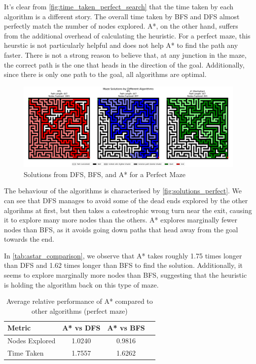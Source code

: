 \documentclass{article}
\begin{document}
It's clear from \autoref{fig:time_taken_perfect_search} that the time taken by each algorithm is a different story. The overall time taken by BFS and DFS almost perfectly match the number of nodes explored. A*, on the other hand, suffers from the additional overhead of calculating the heuristic. For a perfect maze, this heurstic is not particularly helpful and does not help A* to find the path any faster. There is not a strong reason to believe that, at any junction in the maze, the correct path is the one that heads in the direction of the goal. Additionally, since there is only one path to the goal, all algorithms are optimal. 

\begin{figure}[h]
    \centering
    \includegraphics[width=\textwidth]{Solutions_perfectt.png}
    \caption{Solutions from DFS, BFS, and A* for a Perfect Maze}
    \label{fig:solutions_perfect}
\end{figure}

The behaviour of the algorithms is characterised by \autoref{fig:solutions_perfect}. We can see that DFS manages to avoid some of the dead ends explored by the other algorihms at first, but then takes a catestrophic wrong turn near the exit, causing it to explore many more nodes than the others. A* explores marginally fewer nodes than BFS, as it avoids going down paths that head away from the goal towards the end.

In \autoref{tab:astar_comparison}, we observe that A* takes roughly 1.75 times longer than DFS and 1.62 times longer than BFS to find the solution. Additionally, it seems to explore marginally more nodes than BFS, suggesting that the heuristic is holding the algorithm back on this type of maze.

\begin{table}[h]
    \centering
    \begin{tabular}{|l|c|c|c|}
        \hline
        \textbf{Metric} & \textbf{A* vs DFS} & \textbf{A* vs BFS} \\
        \hline
        Nodes Explored & 1.0240 & 0.9816 \\
        \hline
        Time Taken & 1.7557 & 1.6262 \\
        \hline
    \end{tabular}
    \caption{Average relative performance of A* compared to other algorithms (perfect maze)}
    \label{tab:astar_comparison}
\end{table}
\end{document}

